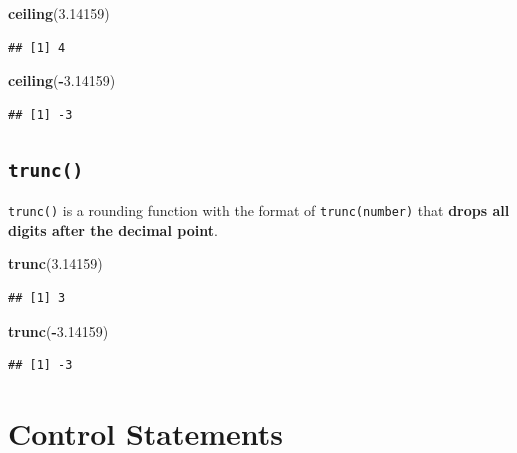 \documentclass[
]{book}
\newenvironment{Shaded}{\begin{snugshade}}{\end{snugshade}}
\newcommand{\FloatTok}[1]{\textcolor[rgb]{0.00,0.00,0.81}{#1}}
\newcommand{\FunctionTok}[1]{\textcolor[rgb]{0.13,0.29,0.53}{\textbf{#1}}}
\newcommand{\NormalTok}[1]{#1}
\newcommand{\SpecialCharTok}[1]{\textcolor[rgb]{0.81,0.36,0.00}{\textbf{#1}}}
\begin{document}
\begin{Shaded}
\begin{Highlighting}[]
\FunctionTok{ceiling}\NormalTok{(}\FloatTok{3.14159}\NormalTok{)}
\end{Highlighting}
\end{Shaded}

\begin{verbatim}
## [1] 4
\end{verbatim}

\begin{Shaded}
\begin{Highlighting}[]
\FunctionTok{ceiling}\NormalTok{(}\SpecialCharTok{{-}}\FloatTok{3.14159}\NormalTok{)}
\end{Highlighting}
\end{Shaded}

\begin{verbatim}
## [1] -3
\end{verbatim}

\hypertarget{trunc}{%
\subsection{\texorpdfstring{\texttt{trunc()}}{trunc()}}\label{trunc}}

\texttt{trunc()} is a rounding function with the format of \texttt{trunc(number)} that \textbf{drops all digits after the decimal point}.

\begin{Shaded}
\begin{Highlighting}[]
\FunctionTok{trunc}\NormalTok{(}\FloatTok{3.14159}\NormalTok{)}
\end{Highlighting}
\end{Shaded}

\begin{verbatim}
## [1] 3
\end{verbatim}

\begin{Shaded}
\begin{Highlighting}[]
\FunctionTok{trunc}\NormalTok{(}\SpecialCharTok{{-}}\FloatTok{3.14159}\NormalTok{)}
\end{Highlighting}
\end{Shaded}

\begin{verbatim}
## [1] -3
\end{verbatim}

\hypertarget{control-statements}{%
\section{Control Statements}\label{control-statements}}
\end{document}
